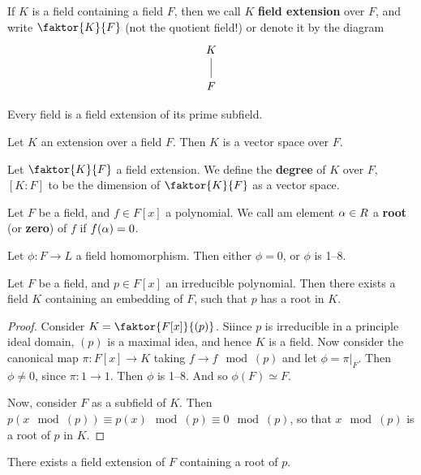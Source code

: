 \begin{definition}
  If $K$ is a field containing a field $F$, then we call  $K$  \textbf{field
  extension} over $F$, and write  $\faktor{K}{F}$ (not the quotient field!) or
  denote it by the diagram
  \[\begin{tikzcd}
    K \\
    F
    \arrow[no head, from=1-1, to=2-1]
  \end{tikzcd}\]
\end{definition}

\begin{lemma}\label{lemma_8.1.2}
  Every field is a field extension of its prime subfield.
\end{lemma}

\begin{lemma}\label{lemma_8.1.3}
  Let $K$ an extension over a field  $F$. Then  $K$ is a vector space over
  $F$.
\end{lemma}

\begin{definition}
  Let $\faktor{K}{F}$ a field extension. We define the \textbf{degree} of $K$
  over $F$, $[K:F]$ to be the dimension of  $\faktor{K}{F}$ as a vector space.
\end{definition}

\begin{definition}
  Let $F$ be a field, and  $f \in F[x]$ a polynomial. We call am element $\alpha
  \in R$ a  \textbf{root} (or \textbf{zero}) of $f$ if  $f(\alpha)=0$.
\end{definition}

\begin{lemma}\label{lemma_8.1.4}
  Let $\phi:F \xrightarrow{} L$ a field homomorphism. Then either $\phi=0$, or
  $\phi$ is 1--8.
\end{lemma}

\begin{lemma}\label{lemma_8.1.5}
  Let $F$ be a field, and  $p \in F[x]$ an irreducible polynomial. Then there
  exists a field $K$ containing an embedding of  $F$, such that  $p$ has a
  root in  $K$.
\end{lemma}
\begin{proof}
  Consider $K=\faktor{F[x]}{(p)}$. Siince $p$ is irreducible in a principle
  ideal domain, $(p)$ is a maximal idea, and hence $K$ is a field. Now
  consider the canonical map  $\pi:F[x] \xrightarrow{} K$ taking $f
  \xrightarrow{} f \mod{(p)}$ and let $\phi=\pi|_{F}$. Then $\phi \neq 0$,
  since  $\pi:1 \xrightarrow{} 1$. Then $\phi$ is 1--8. And so  $\phi(F)
  \simeq F$.

  Now, consider $F$ as a subfield of  $K$. Then $p(x \mod{(p)}) \equiv
  p(x) \mod{(p)} \equiv 0 \mod{(p)}$, so that $x \mod{(p)}$ is a root of
  $p$ in  $K$.
\end{proof}
\begin{corollary}
  There exists a field extension of $F$ containing a root of  $p$.
\end{corollary}

